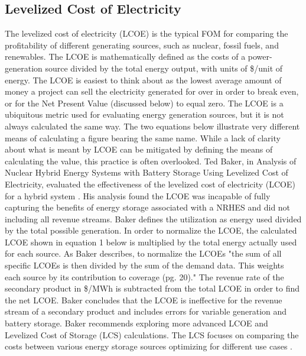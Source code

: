 \documentclass[12pt]{UIdahoMastersThesis}
\begin{document}
\subsection{Levelized Cost of Electricity}
The levelized cost of electricity (LCOE) is the typical FOM for comparing the profitability of different generating sources, such as nuclear, fossil fuels, and renewables. The LCOE is mathematically defined as the costs of a power-generation source divided by the total energy output, with units of \$/unit of energy. The LCOE is easiest to think about as the lowest average amount of money a project can sell the electricity generated for over in order to break even, or for the Net Present Value (discussed below) to equal zero. The LCOE is a ubiquitous metric used for evaluating energy generation sources, but it is not always calculated the same way.  The two equations below illustrate very different means of calculating a figure bearing the same name.  While a lack of clarity about what is meant by LCOE can be mitigated by defining the means of calculating the value, this practice is often overlooked.
Ted Baker, in Analysis of Nuclear Hybrid Energy Systems with Battery Storage Using Levelized Cost of Electricity, evaluated the effectiveness of the levelized cost of electricity (LCOE) for a hybrid system \cite{Baker2016}. His analysis found the LCOE was incapable of fully capturing the benefits of energy storage associated with a NRHES and did not including all revenue streams.  Baker defines the utilization as energy used divided by the total possible generation. In order to normalize the LCOE, the calculated LCOE shown in equation 1 below is multiplied by the total energy actually used for each source.  As Baker describes, to normalize the LCOEs "the sum of all specific LCOEs is then divided by the sum of the demand data. This weights each source by its contribution to coverage (pg. 20)."  The revenue rate of the secondary product in \$/MWh is subtracted from the total LCOE in order to find the net LCOE.  Baker concludes that the LCOE is ineffective for the revenue stream of a secondary product and includes errors for variable generation and battery storage. Baker recommends exploring more advanced LCOE and Levelized Cost of Storage (LCS) calculations. The LCS focuses on comparing the costs between various energy storage sources optimizing for different use cases \cite{Tyskiewiczd}.
\end{document}

